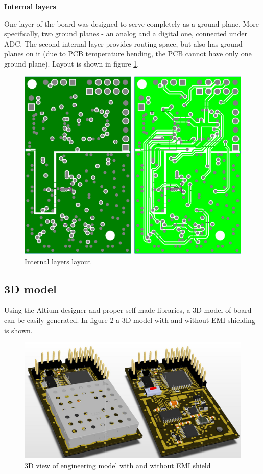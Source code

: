         \bigskip \textbf{Internal layers}

        One layer of the board was designed to serve completely as a ground plane. More specifically, two ground planes - an analog and a digital one, connected under ADC. The second internal layer provides routing space, but also has ground planes on it (due to PCB temperature bending, the PCB cannot have only one ground plane). Layout is shown in figure \ref{internal_layers_layout}.

        \begin{figure}[H]
            \centering
            \includegraphics[width=0.5\paperwidth]{img/06/internal_layers_layout.eps}
            \caption{Internal layers layout}
            \label{internal_layers_layout}
        \end{figure}

    \subsection{3D model}
        Using the Altium designer and proper self-made libraries, a 3D model of board can be easily generated. In figure \ref{pcb_3d_model} a 3D model with and without EMI shielding is shown.

        \begin{figure}[H]
            \centering
            \includegraphics[width=0.8\paperwidth]{img/06/pcb_3d_model.png}
            \caption{3D view of engineering model with and without EMI shield}
            \label{pcb_3d_model}
        \end{figure}

